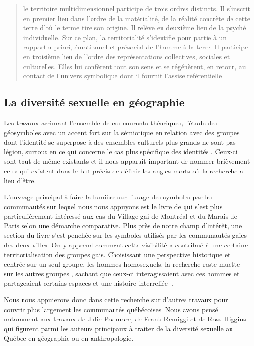 \blockquote[{\cite[108]{DiMeo1998}}][.]{\textelp{} le territoire multidimensionnel participe de trois ordres distincts. Il s'inscrit en premier lieu dans l'ordre de la matérialité, de la réalité concrète de cette terre d'où le terme tire son origine. Il relève en deuxième lieu de la psyché individuelle. Sur ce plan, la territorialité s'identifie pour partie à un rapport a priori, émotionnel et présocial de l'homme à la terre. Il participe en troisième lieu de l'ordre des représentations collectives, sociales et culturelles. Elles lui confèrent tout son sens et se régénèrent, en retour, au contact de l'univers symbolique dont il fournit l'assise référentielle}.



\subsection{La diversité sexuelle en géographie}
\label{sec:la_diversit_sexuelle_en_g_ographie}  
Les travaux arrimant l'ensemble de ces courants théoriques, l'étude des géosymboles avec un accent fort sur la sémiotique en relation avec des groupes dont l'identité se superpose à des ensembles culturels plus grands ne sont pas légion, surtout en ce qui concerne le cas plus spécifique des identités \lgbt{}. 
Ceux-ci sont tout de même existants et il nous apparait important de nommer brièvement ceux qui existent dans le but précis de définir les angles morts où la recherche a lieu d'être.

L'ouvrage principal à faire la lumière sur l'usage des symboles par les communautés \lgbt{} sur lequel nous nous appuyons est le livre  de \citet{Giraud2014} qui s'est plus particulièrement intéressé aux cas du Village gai de Montréal et du Marais de Paris selon une démarche comparative. 
Plus près de notre champ d'intérêt, une section du livre s'est penchée sur les symboles utilisés par les communautés gaies des deux villes. 
On y apprend comment cette visibilité a contribué à une certaine territorialisation des groupes gais. 
Choisissant une perspective historique et centrée sur un seul groupe, les hommes homosexuels, la recherche reste muette sur les autres groupes \lgbt{}, sachant que ceux-ci interagissaient avec ces hommes et partageaient certains espaces et une histoire interreliée~\citep{Remiggi2000,Demczuk1998,Podmore2001,Higgins1997,Higgins1999}.

Nous nous appuierons donc dans cette recherche sur d'autres travaux pour couvrir plus largement les communautés \lgbt{} québécoises. 
Nous avons pensé notamment aux travaux de Julie Podmore, de Frank Remiggi et de Ross Higgins qui figurent parmi les auteurs principaux à traiter de la diversité sexuelle au Québec en géographie ou en anthropologie.

